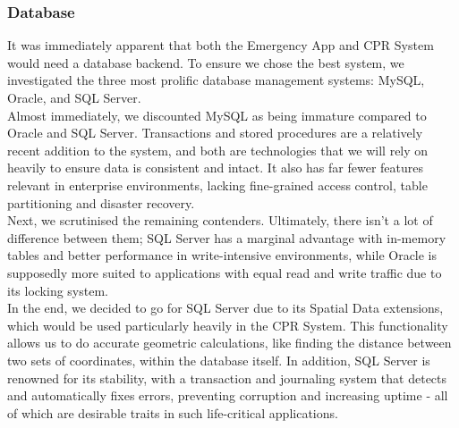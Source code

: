 \documentclass{article}
\begin{document}
\pagebreak
	\subsubsection{Database}
	It was immediately apparent that both the Emergency App and CPR System would need a database backend. To ensure we chose the best system, we investigated the three most prolific database management systems: MySQL, Oracle, and SQL Server.\\

Almost immediately, we discounted MySQL as being immature compared to Oracle and SQL Server. Transactions and stored procedures are a relatively recent addition to the system, and both are technologies that we will rely on heavily to ensure data is consistent and intact. It also has far fewer features relevant in enterprise environments, lacking fine-grained access control, table partitioning and disaster recovery.\\

Next, we scrutinised the remaining contenders. Ultimately, there isn't a lot of difference between them; SQL Server has a marginal advantage with in-memory tables and better performance in write-intensive environments, while Oracle is supposedly more suited to applications with equal read and write traffic due to its locking system.\\

In the end, we decided to go for SQL Server due to its Spatial Data extensions, which would be used particularly heavily in the CPR System. This functionality allows us to do accurate geometric calculations, like finding the distance between two sets of coordinates, within the database itself. In addition, SQL Server is renowned for its stability, with a transaction and journaling system that detects and automatically fixes errors, preventing corruption and increasing uptime - all of which are desirable traits in such life-critical applications.\\
	
\end{document}
